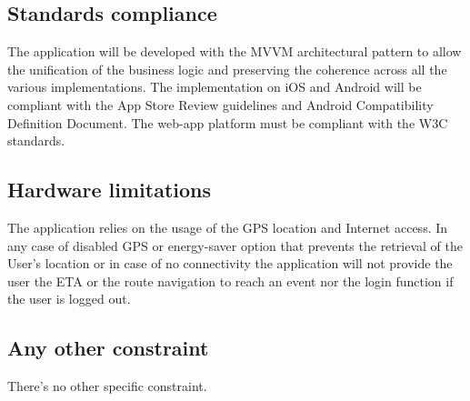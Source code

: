 \subsection{Standards compliance}
The application will be developed with the MVVM architectural pattern to allow the unification of the business logic and preserving the coherence across all the various implementations.
The implementation on iOS and Android will be compliant with the App Store Review guidelines and Android Compatibility Definition Document.
The web-app platform must be compliant with the W3C standards.

\subsection{Hardware limitations}
The application relies on the usage of the GPS location and Internet access. In any case of disabled GPS or energy-saver option that prevents the retrieval of the User’s location or in case of no connectivity the application will not provide the user the ETA or the route navigation to reach an event nor the login function if the user is logged out.

\subsection{Any other constraint}
There's no other specific constraint.
